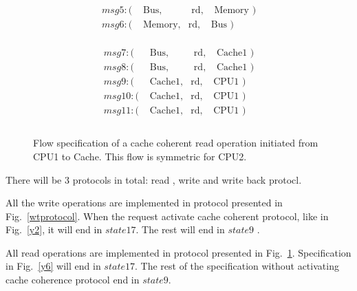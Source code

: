 \documentclass[12pt,frontmatter,copyright,thesis]{usfmanus}
\begin{document}
\begin{appendix}
\begin{figure}[h]
\begin{minipage}{.5\textwidth}
{\[\begin{array}{llll}
 msg5: (&\mbox{ Bus},&\mbox{ rd},&\mbox{ Memory     })\\ 
 msg6: (&\mbox{ Memory},&\mbox{rd},&\mbox{Bus     })\\
 \end{array}
 \]}
 \end{minipage}%
 \begin{minipage}{.5\textwidth}
 {\footnotesize
 \[
 \begin{array}{llll}
 msg7: (&\mbox{ Bus},&\mbox{ rd},&\mbox{ Cache1 })\\
 msg8: (&\mbox{ Bus},&\mbox{ rd},&\mbox{ Cache1 })\\
 msg9: (&\mbox{ Cache1},&\mbox{rd},&\mbox{CPU1       })\\
 msg10: (&\mbox{ Cache1},&\mbox{rd},&\mbox{CPU1       })\\
 msg11: (&\mbox{ Cache1},&\mbox{rd},&\mbox{CPU1       })\\\\
 \end{array}
 \]}
 \end{minipage}
 \caption{\footnotesize Flow specification of a cache coherent read operation initiated from CPU1 to Cache. \footnotesize This flow is symmetric for CPU2. }
 \label{readprotocol}
 \end{figure}
 
 
There will be 3 protocols in total: read , write and write back protocl.

All the write operations are implemented in protocol presented in Fig.~\ref{wtprotocol}.
When the request activate cache coherent protocol, like in Fig.~\ref{y2}, it will end in $state 17$. The rest will end in $state 9$ .


All read operations are implemented in protocol presented in Fig.~\ref{readprotocol}. Specification in Fig.~\ref{y6} will end in $state 17$. 
The rest of the specification without activating cache coherence protocol end in $state 9$.

\end{appendix}


\begin{spacing}{1}


\end{spacing}
\end{document}
